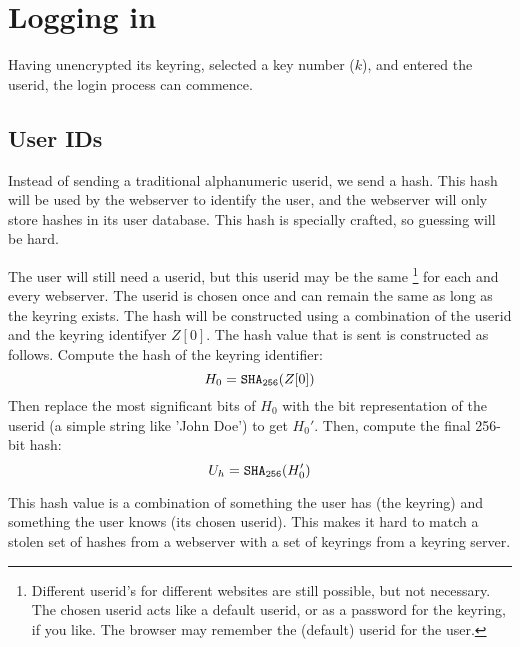 %
%
%
\section{Logging in}
\label{logging_in}
Having unencrypted its keyring, selected a key number ($k$), and entered the userid, the login process can commence.

\subsection{User IDs}
\label{sec:user_ids}
Instead of sending a traditional alphanumeric userid,
we send a hash.
This hash will be used by the webserver to identify the user,
and the webserver will only store hashes in its user database.
This hash is specially crafted,
so guessing will be hard.
\par
The user will still need a userid,
but this userid may be the same%
\footnote{Different userid's for different websites are still possible, but not necessary.
The chosen userid acts like a default userid, or as a password for the keyring, if you like.
The browser may remember the (default) userid for the user.}
for each and every webserver.
The userid is chosen once and can remain the same as long as the keyring exists.
The hash will be constructed using a combination of the userid and the keyring identifyer $Z[0]$.
The hash value that is sent is constructed as follows.
Compute the hash of the keyring identifier:
\[H_0=\texttt{\ensuremath{\mathtt{SHA_{256}}}}(Z[0])\]
Then replace the most significant bits of $H_0$ with the bit representation of the userid
(a simple string like 'John Doe')
to get $H_0'$.
Then, compute the final 256-bit hash:
\[U_h=\texttt{\ensuremath{\mathtt{SHA_{256}}}}(H_0')\]
\par
This hash value is a combination of something the user has
(the keyring)
and something the user knows
(its chosen userid).
This makes it hard to match a stolen set of hashes from a webserver with a set of keyrings from a keyring server.

